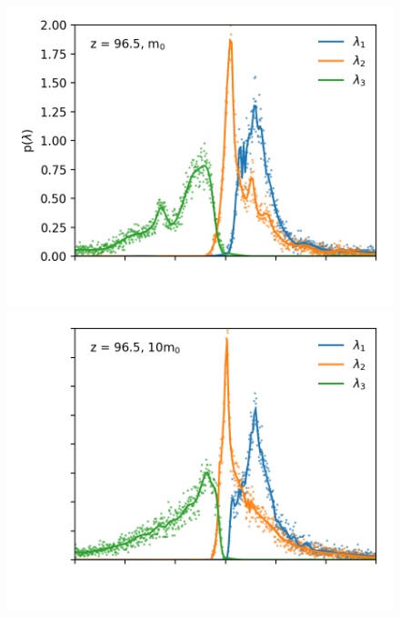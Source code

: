 \documentclass[a4paper,11pt]{article}
\begin{document}
\begin{figure}[!htb]

  \includegraphics[trim={1cm 0 0 0},scale=0.8]{distro_single_light_7.png}
\endminipage\hfill
{}%
  \includegraphics[trim={1cm 0 0 0},scale=0.8]{distro_single_mid_7.png}
\endminipage


\end{figure}
\end{document}

